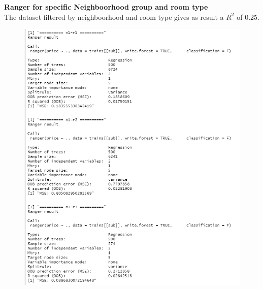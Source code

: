 \documentclass{FR16}
\begin{document}
\textbf{Ranger for specific Neighboorhood group and room type}\\
The dataset filtered by neighboorhood and room type gives as result a $R^2$ of 0.25.
\begin{figure}[!htb]
   \begin{minipage}{0.48\textwidth}
     \centering
     \includegraphics[width=1\linewidth]{figures/rgn2.1.png} 
   \end{minipage}\hfill
   \begin{minipage}{0.48\textwidth}
     \centering

\end{minipage}
\end{figure}
\end{document}
